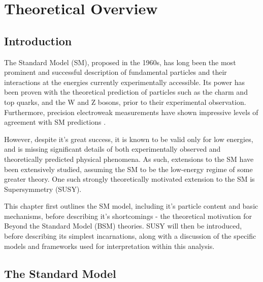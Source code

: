 
\chapter{Theoretical Overview}
\label{ch:theory}

\ifpdf
    \graphicspath{{Chapter2/Figs/Raster/}{Chapter2/Figs/PDF/}{Chapter2/Figs/}}
\else
    \graphicspath{{Chapter2/Figs/Vector/}{Chapter2/Figs/}}
\fi


\section{Introduction}  %
\label{sec:theory_intro}

The Standard Model (SM), proposed in the 1960s, has long been the most prominent and
successful description of fundamental particles and their interactions at the
energies currently experimentally accessible. Its power has been proven with the 
theoretical prediction of particles such as the charm and top quarks, and the W
and Z bosons, prior to their experimental observation. Furthermore, precision 
electroweak measurements have shown impressive levels of  agreement with SM
predictions \cite{ALEPH:2010aa, Baak:2014ora}.

However, despite it's great success, it is known to be valid only for low 
energies, and is missing significant details of both experimentally 
observed and theoretically predicted physical phenomena. As such, extensions to
the SM have been extensively studied, assuming the SM to be the low-energy 
regime of some greater theory. One such strongly theoretically motivated
extension to the SM is Supersymmetry (SUSY).

This chapter first outlines the SM model, including it's particle content and basic 
mechanisms, before describing it's shortcomings - the theoretical 
motivation for Beyond the Standard Model (BSM) theories. SUSY will then be 
introduced, before describing its simplest incarnations, along with a discussion
of the specific models and frameworks used for interpretation within this
analysis.

\section{The Standard Model}
\label{sec:theory_current}

